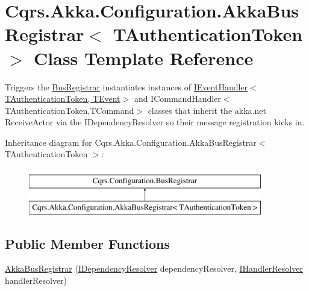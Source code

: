 \hypertarget{classCqrs_1_1Akka_1_1Configuration_1_1AkkaBusRegistrar}{}\section{Cqrs.\+Akka.\+Configuration.\+Akka\+Bus\+Registrar$<$ T\+Authentication\+Token $>$ Class Template Reference}
\label{classCqrs_1_1Akka_1_1Configuration_1_1AkkaBusRegistrar}


Triggers the \hyperlink{classCqrs_1_1Configuration_1_1BusRegistrar_a4a934d21a535b28af6c67154512bba20_a4a934d21a535b28af6c67154512bba20}{Bus\+Registrar} instantiates instances of \hyperlink{interfaceCqrs_1_1Events_1_1IEventHandler}{I\+Event\+Handler$<$\+T\+Authentication\+Token, T\+Event$>$} and I\+Command\+Handler$<$\+T\+Authentication\+Token,\+T\+Command$>$ classes that inherit the akka.\+net Receive\+Actor via the I\+Dependency\+Resolver so their message registration kicks in.  


Inheritance diagram for Cqrs.\+Akka.\+Configuration.\+Akka\+Bus\+Registrar$<$ T\+Authentication\+Token $>$\+:\begin{figure}[H]
\begin{center}
\leavevmode
\includegraphics[height=2.000000cm]{classCqrs_1_1Akka_1_1Configuration_1_1AkkaBusRegistrar}
\end{center}
\end{figure}
\subsection*{Public Member Functions}
\begin{DoxyCompactItemize}
\item 
\hyperlink{classCqrs_1_1Akka_1_1Configuration_1_1AkkaBusRegistrar_a49ab48e3305b6eb17f2a68fc2996a988_a49ab48e3305b6eb17f2a68fc2996a988}{Akka\+Bus\+Registrar} (\hyperlink{interfaceCqrs_1_1Configuration_1_1IDependencyResolver}{I\+Dependency\+Resolver} dependency\+Resolver, \hyperlink{interfaceCqrs_1_1Akka_1_1Configuration_1_1IHandlerResolver}{I\+Handler\+Resolver} handler\+Resolver)
\end{DoxyCompactItemize}
